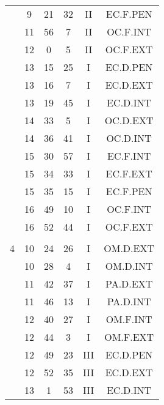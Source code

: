 \documentclass[12pt, a4paper]{article}
\begin{document}
\begin{multicols}{3}
{\begin{tabular}{c c c c c c}
	 	 	 	 & 9 & 21 & 32 & II & EC.F.PEN\\%
	 	 	 	 & 11 & 56 & 7 & II & OC.F.INT\\%
	 	 	 	 & 12 & 0 & 5 & II & OC.F.EXT\\%
	 	 	 	 & 13 & 15 & 25 & I & EC.D.PEN\\%
	 	 	 	 & 13 & 16 & 7 & I & EC.D.EXT\\%
	 	 	 	 & 13 & 19 & 45 & I & EC.D.INT\\%
	 	 	 	 & 14 & 33 & 5 & I & OC.D.EXT\\%
	 	 	 	 & 14 & 36 & 41 & I & OC.D.INT\\%
	 	 	 	 & 15 & 30 & 57 & I & EC.F.INT\\%
	 	 	 	 & 15 & 34 & 33 & I & EC.F.EXT\\%
	 	 	 	 & 15 & 35 & 15 & I & EC.F.PEN\\%
	 	 	 	 & 16 & 49 & 10 & I & OC.F.INT\\%
	 	 	 	 & 16 & 52 & 44 & I & OC.F.EXT\\%
	 	 	 	 & & & & & \\%
	 	 	 	4 & 10 & 24 & 26 & I & OM.D.EXT\\%
	 	 	 	 & 10 & 28 & 4 & I & OM.D.INT\\%
	 	 	 	 & 11 & 42 & 37 & I & PA.D.EXT\\%
	 	 	 	 & 11 & 46 & 13 & I & PA.D.INT\\%
	 	 	 	 & 12 & 40 & 27 & I & OM.F.INT\\%
	 	 	 	 & 12 & 44 & 3 & I & OM.F.EXT\\%
	 	 	 	 & 12 & 49 & 23 & III & EC.D.PEN\\%
	 	 	 	 & 12 & 52 & 35 & III & EC.D.EXT\\%
	 	 	 	 & 13 & 1 & 53 & III & EC.D.INT\\%

\end{tabular}}
\end{multicols}
\end{document}
